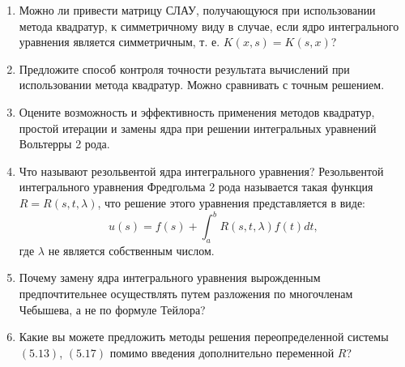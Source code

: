 \documentclass[12pt, a4paper]{article}
\begin{document}
\begin{enumerate}
    \item Можно ли привести матрицу СЛАУ, получающуюся при использовании метода квадратур, к симметричному виду в случае, если ядро интегрального уравнения является симметричным, т. е. $ K(x, s) = K(s, x) $?

    \item Предложите способ контроля точности результата вычислений при использовании метода квадратур.
    Можно сравнивать с точным решением.

    \item Оцените возможность и эффективность применения методов квадратур, простой итерации и замены ядра при решении интегральных уравнений Вольтерры 2 рода.

    \item Что называют резольвентой ядра интегрального уравнения?
    Резольвентой интегрального уравнения Фредгольма 2 рода называется такая функция $ R = R(s, t, \lambda) $, что решение этого уравнения представляется в виде:
    \[
      u(s) = f(s) + \displaystyle \int_a^b R(s, t, \lambda) f(t) dt,
    \]
    где $\lambda$ не является собственным числом.
    \item Почему замену ядра интегрального уравнения вырожденным предпочтительнее осуществлять путем разложения по многочленам Чебышева, а не по формуле Тейлора?

    \item Какие вы можете предложить методы решения переопределенной системы $ (5.13) $, $ (5.17) $ помимо введения дополнительно переменной $ R $?
    \end{enumerate}

    \newpage
\end{document}
